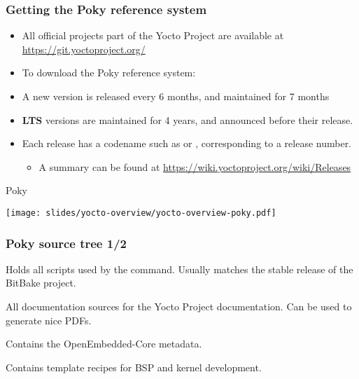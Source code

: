 \begin{frame}
  \frametitle{Getting the Poky reference system}
  \begin{itemize}
    \item All official projects part of the Yocto Project are
          available at \url{https://git.yoctoproject.org/}
    \item To download the Poky reference system: \\
          {\small
          }
    \item A new version is released every 6 months, and maintained for 7 months
    \item \textbf{LTS} versions are maintained for 4 years, and announced before their release.
    \item Each release has a codename such as  or ,
	  corresponding to a release number.
		  \begin{itemize}
			  \item A summary can be found at \url{https://wiki.yoctoproject.org/wiki/Releases}
		  \end{itemize}
  \end{itemize}
\end{frame}

\begin{frame}{Poky}
  \begin{center}
    \texttt{[image: slides/yocto-overview/yocto-overview-poky.pdf]}
  \end{center}
\end{frame}

\begin{frame}
  \frametitle{Poky source tree 1/2}
  \begin{description}[style=nextline]
  \item[bitbake/] Holds all scripts used by the  command.
    Usually matches the stable release of the BitBake project.
  \item[documentation/] All documentation sources for the Yocto
    Project documentation. Can be used to generate nice PDFs.
  \item[meta/] Contains the OpenEmbedded-Core metadata.
  \item[meta-skeleton/] Contains template recipes for BSP and
    kernel development.
  \end{description}
\end{frame}

